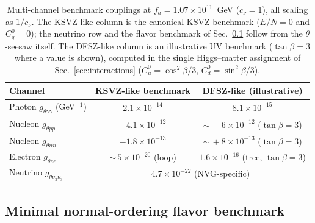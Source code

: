 \documentclass[11pt,a4paper]{article}
\begin{document}
\begin{table}[h]
\centering
\caption{Multi-channel benchmark couplings at
$f_a = 1.07\times 10^{11}$~GeV ($c_\nu = 1$), all scaling as $1/c_\nu$.
The KSVZ-like column is the canonical KSVZ benchmark ($E/N = 0$ and
$C_q^{0} = 0$); the neutrino row and the flavor benchmark of
Sec.~\ref{sec:flavor} follow from the $\theta$-seesaw itself.
The DFSZ-like column is an illustrative UV benchmark
($\tan\beta = 3$ where a value is shown), computed in the single
Higgs--matter assignment of Sec.~\ref{sec:interactions}
($C_u^{0} = \cos^{2}\!\beta/3$, $C_d^{0} = \sin^{2}\!\beta/3$).}
\label{tab:channels}
\begin{tabular}{lcc}
\toprule
Channel & KSVZ-like benchmark & DFSZ-like (illustrative) \\
\midrule
Photon $g_{\theta\gamma\gamma}$ (GeV$^{-1}$) & $2.1\times 10^{-14}$ & $8.1\times 10^{-15}$ \\
Nucleon $g_{\theta pp}$ & $-4.1\times 10^{-12}$ & ${\sim}\,-6\times 10^{-12}$ ($\tan\beta = 3$) \\
Nucleon $g_{\theta nn}$ & $-1.8\times 10^{-13}$ & ${\sim}\,+8\times 10^{-13}$ ($\tan\beta = 3$) \\
Electron $g_{\theta ee}$ & ${\sim}\,5\times 10^{-20}$ (loop) & $1.6\times 10^{-16}$ (tree, $\tan\beta = 3$) \\
Neutrino $g_{\theta\nu_3\nu_3}$ & \multicolumn{2}{c}{$4.7\times 10^{-22}$ (NVG-specific)} \\
\bottomrule
\end{tabular}
\end{table}

\subsection{Minimal normal-ordering flavor benchmark}
\label{sec:flavor}
\end{document}
